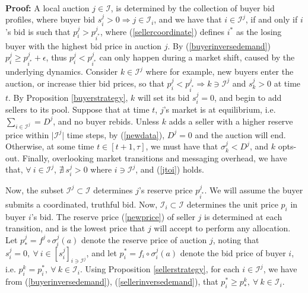 \documentclass[12pt]{article}
\theoremstyle{definition}
\newcommand{\mcI}{\mathcal{I}}
\newcommand{\g}{\sigma}
\begin{document}
\begin{multicols}{2}
{\begin{equation}
\end{equation}
}\\
\textbf{Proof:}
A local auction $j\in\mcI$, is determined by the collection of buyer bid
profiles, where buyer bid $s_i^j > 0 \Rightarrow j\in\mcI_i$, and we have that $i\in\mcI^j$,
if and only if $i$'s bid is such that $p_i^j > p_{i^*}^j$, where
(\ref{sellercoordinate}) defines $i^*$ as the losing buyer with the highest bid
price in auction $j$. By (\ref{buyerinversedemand}) $p_i^j \ge
p_{i^*}^j+\epsilon$, thus $p_i^j < p_{i^*}^j$ can only happen during a market
shift, caused by the underlying dynamics.
Consider $k\in\mcI^j$ where for example, new buyers enter the auction, or increase
thier bid prices, so that $p_i^j < p_{i^*}^j\Rightarrow k\ni\mcI^j$ and
$s_k^j>0$ at time $t$. 
By Proposition \ref{buyerstrategy}, $k$ will set its bid $s_i^j=0$, and begin to add sellers to its pool.
Suppose that at time $t$, $j$'s market is at equilibrium, i.e. $\sum_{i\in\mcI^j} = D^j$, and
no buyer rebids. Unless $k$ adds a seller with a higher reserve
price within $\vert\mcI^j\vert$ time steps, by (\ref{newdata}), $D^j=0$ and the
auction will end. Otherwise, at some time $t\in[t+1,\tau]$, we must have that $\g_k^j <
D^j$, and $k$ opts-out. Finally, overlooking market transitions and messaging
overhead, we have that,
$\forall \ i\in\mcI^j$, $\nexists \ s_i^j > 0$ where $i \ni \mcI^j$, and (\ref{jtoi})
holds.
\iffalse
Furthermore, we note that $\lambda \subset \mcI$ is a complete and disjoint set
of bid vectors with respect to auction $j$. That is, $\forall \ i \in \mcI^j,
s_i^k > 0 \in \lambda$ if and only if $s_i^k>0 \in\mcI$, and so $s_i \in \lambda
\equiv s_i \in \mcI$. (NEED TO ADD TO LEMMA AND PROVE?)
\fi

Now, the subset $\mcI^j \subset \mcI$
determines $j$'s reserve price $p_{i^*}^j$. We will assume the buyer submits a
coordinated, truthful bid. Now, $\mcI_i\subset \mcI$ 
determines the unit price $p_{i}$ in buyer $i$'s bid.
The reserve price (\ref{newprice}) of seller $j$ is determined at each
transition, and is
the lowest price that $j$ will accept to perform any allocation.
Let $p_*^j = f^j \circ \g_i^j(a) $ denote the reserve
price of auction $j$, noting that $s_i^j=0, \ \forall \ i \in
[s_i^j]_{i\ni\mcI^j}$, and let $p_i^*= f_i \circ \g_i^j(a)$ denote the bid price of buyer $i$, i.e. $p_i^k = p_i^*,
\ \forall \ k \in\mcI_i$. 
Using Proposition
\ref{sellerstrategy}, for each $i \in \mcI^j$, we have from (\ref{buyerinversedemand}), (\ref{sellerinversedemand}), that $p_i^* \ge p_*^k,
\ \forall \ k \in\mcI_i$.


\end{multicols}
\end{document}
